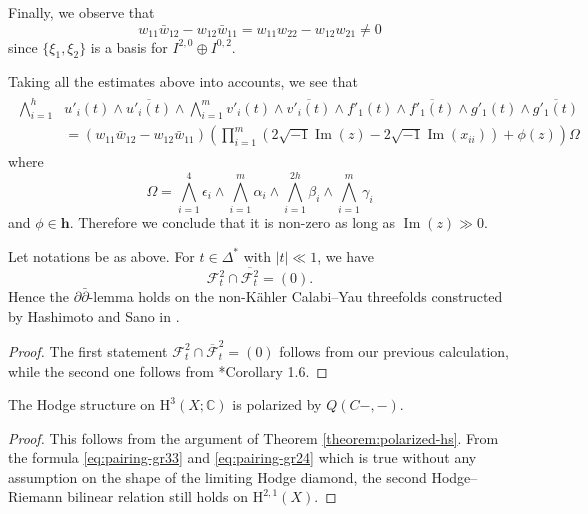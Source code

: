 Finally, we observe that 
\begin{equation}
w_{11}\bar{w}_{12}-w_{12}\bar{w}_{11} = w_{11}w_{22} - w_{12}w_{21}\ne 0
\end{equation}
since \(\{\xi_{1},\xi_{2}\}\) is a basis for \(I^{2,0}\oplus I^{0,2}\).

Taking all the estimates above
into accounts, we see that
\begin{align*}
\begin{split}
\bigwedge_{i=1}^{h} &u'_{i}(t)\wedge\overline{u'_{i}(t)}\wedge
\bigwedge_{i=1}^{m} v'_{i}(t)\wedge\overline{v'_{i}(t)}
\wedge f'_{1}(t)\wedge\overline{f'_{1}(t)}\wedge
g'_{1}(t)\wedge\overline{g'_{1}(t)}\\
&=(w_{11}\bar{w}_{12}-w_{12}\bar{w}_{11})\left(\prod_{i=1}^{m}(2\sqrt{-1}\operatorname{Im}(z)-2\sqrt{-1}
\operatorname{Im}(x_{ii}))+\phi(z)
\right)\Omega
\end{split}
\end{align*}
where
\begin{equation*}
\Omega = \bigwedge_{i=1}^{4}\epsilon_{i}\wedge 
\bigwedge_{i=1}^{m}\alpha_{i}\wedge\bigwedge_{i=1}^{2h}\beta_{i}\wedge
\bigwedge_{i=1}^{m}\gamma_{i}
\end{equation*}
and \(\phi\in\mathbf{h}\). Therefore we conclude that it is non-zero as
long as \(\operatorname{Im}(z)\gg 0\). 
\begin{theorem}
\label{thm:hs-example-ddbar}
Let notations be as above.
For \(t\in\Delta^{\ast}\) with \(|t|\ll 1\), we have
\begin{equation}
\mathcal{F}^{2}_{t}\cap \overline{\mathcal{F}^{2}_{t}}=(0).
\end{equation}
Hence the \(\partial\bar{\partial}\)-lemma holds on 
the non-K\"{a}hler Calabi--Yau threefolds constructed by Hashimoto and Sano
in \cite{2023-Hashimoto-Sano-examples-of-non-kahler-calabi-yau-3-folds-with-arbitrarily-large-b2}.
\end{theorem}
\begin{proof}
The first statement \(\mathcal{F}^{2}_{t}\cap \overline{\mathcal{F}}^{2}_{t}=(0)\)
follows from our previous calculation, while the second one follows from
\cite{2019-Friedman-the-ddbar-lemma-for-general-clemens-manifolds}*{Corollary 1.6}.
\end{proof}

\begin{theorem}
\label{thm:hs-example-polarized}
The Hodge structure on \(\mathrm{H}^{3}(X;\mathbb{C})\)
is polarized by \(Q(C-,-)\).
\end{theorem}
\begin{proof}
This follows from the argument of Theorem \ref{theorem:polarized-hs}.
From the formula
\eqref{eq:pairing-gr33} and \eqref{eq:pairing-gr24} which is true without any assumption
on the shape of the limiting Hodge diamond,
the second Hodge--Riemann bilinear relation still holds on \(\mathrm{H}^{2,1}(X)\).
\end{proof}



